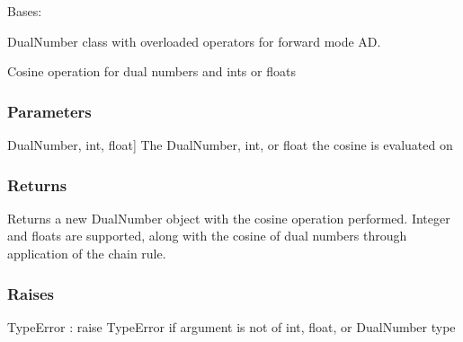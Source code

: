 \documentclass[letterpaper,10pt,english]{sphinxmanual}
\begin{document}
\begin{fulllineitems}
\label{\detokenize{autodiff:autodiff.DualNumber}}
\pysigstartsignatures
{}
\pysigstopsignatures
\sphinxAtStartPar
Bases: 

\sphinxAtStartPar
DualNumber class with overloaded operators for forward mode AD.

\end{fulllineitems}


\begin{fulllineitems}
\label{\detokenize{autodiff:autodiff.cos}}
\pysigstartsignatures
{}
\pysigstopsignatures
\sphinxAtStartPar
Cosine operation for dual numbers and ints or floats


\subsubsection{Parameters}
\label{\detokenize{autodiff:id51}}\begin{description}
\sphinxlineitem{x}{[}DualNumber, int, float{]}
\sphinxAtStartPar
The DualNumber, int, or float the cosine is evaluated on

\end{description}


\subsubsection{Returns}
\label{\detokenize{autodiff:id52}}\begin{description}
\sphinxAtStartPar
Returns a new DualNumber object with the cosine operation performed. Integer and
floats are supported, along with the cosine of dual numbers through application 
of the chain rule.

\end{description}


\subsubsection{Raises}
\label{\detokenize{autodiff:id53}}
\sphinxAtStartPar
TypeError : raise TypeError if argument is not of int, float, or DualNumber type

\end{fulllineitems}
\end{document}
